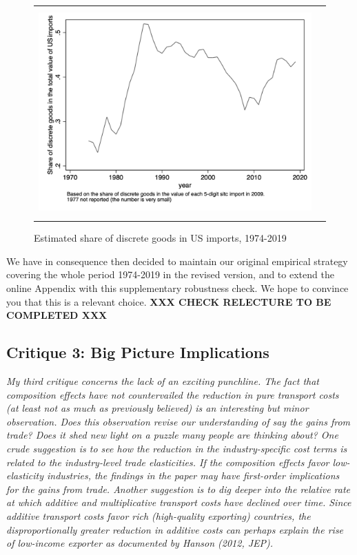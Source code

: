 \documentclass[a4paper,11pt]{article}
\begin{document}
\begin{figure}[htbp]
	\caption{Estimated share of discrete goods in US imports, 1974-2019}
	\begin{center}
		\begin{tabular}{cc}
			\includegraphics[height=8cm]{../../revised_article/Share_of_discrete_goods.png}\\
		\end{tabular}
	\end{center}
	\label{graph_Share_of_discrete_goods.png}%
\end{figure}


We have in consequence then decided to maintain our original empirical strategy covering the whole period 1974-2019 in the revised version, and to extend the online Appendix with this supplementary robustness check.
We hope to convince you that this is a relevant choice. \textbf{XXX CHECK RELECTURE TO BE COMPLETED XXX}

\subsection{Critique 3: Big Picture Implications}

\textit{My third critique concerns the lack of an exciting punchline. The fact that
composition effects have not countervailed the reduction in pure transport costs
(at least not as much as previously believed) is an interesting but minor observation.
Does this observation revise our understanding of say the gains from
trade? Does it shed new light on a puzzle many people are thinking about?
One crude suggestion is to see how the reduction in the industry-specific cost
terms is related to the industry-level trade elasticities. If the composition effects
favor low-elasticity industries, the findings in the paper may have first-order
implications for the gains from trade.
Another suggestion is to dig deeper into the relative rate at which additive
and multiplicative transport costs have declined over time. Since additive transport
costs favor rich (high-quality exporting) countries, the disproportionally
greater reduction in additive costs can perhaps explain the rise of low-income
exporter as documented by Hanson (2012, JEP).}
\end{document}
